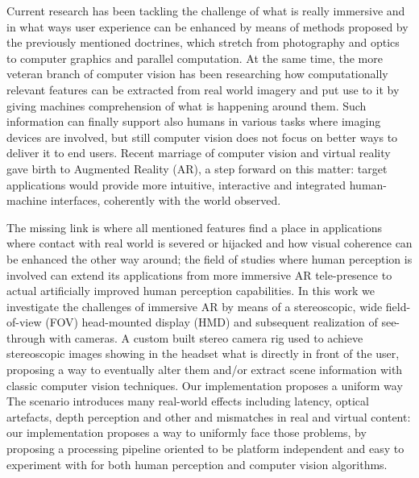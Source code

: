 Current research has been tackling the challenge of what is really immersive and in what ways user experience can be enhanced by means of methods proposed by the previously mentioned doctrines, which stretch from photography and optics to computer graphics and parallel computation. At the same time, the more veteran branch of computer vision has been researching how computationally relevant features can be extracted from real world imagery and put use to it by giving machines comprehension of what is happening around them. Such information can finally support also humans in various tasks where imaging devices are involved, but still computer vision does not focus on better ways to deliver it to end users. Recent marriage of computer vision and virtual reality gave birth to Augmented Reality (AR), a step forward on this matter: target applications would provide more intuitive, interactive and integrated human-machine interfaces, coherently with the world observed.

The missing link is where all mentioned features find a place in applications where contact with real world is severed or hijacked and how visual coherence can be enhanced the other way around; the field of studies where human perception is involved can extend its applications from more immersive AR tele-presence to actual artificially improved human perception capabilities. In this work we investigate the challenges of immersive AR by means of a stereoscopic, wide field-of-view (FOV) head-mounted display (HMD) and subsequent realization of see-through with cameras. A custom built stereo camera rig used to achieve stereoscopic images showing in the headset what is directly in front of the user, proposing a way to eventually alter them and/or extract scene information with classic computer vision techniques. Our implementation proposes a uniform way The scenario introduces many real-world effects including latency, optical artefacts, depth perception and other and mismatches in real and virtual content: our implementation proposes a way to uniformly face those problems, by proposing a processing pipeline oriented to be platform independent and easy to experiment with for both human perception and computer vision algorithms.

